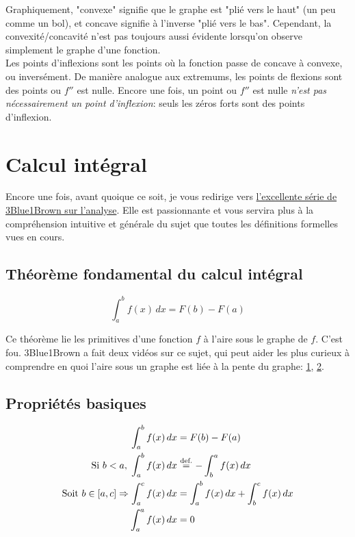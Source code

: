 \documentclass{article}
\newcommand\eqdef{\; \stackrel{ \mathclap{ \normalfont\text{def.} } }{ = } \;} %
\begin{document}
Graphiquement, "convexe" signifie que le graphe est "plié vers le haut" (un peu comme un bol), et concave signifie à l'inverse "plié vers le bas". Cependant, la convexité/concavité n'est pas toujours aussi évidente lorsqu'on observe simplement le graphe d'une fonction. \\

Les points d'inflexions sont les points où la fonction passe de concave à convexe, ou inversément. De manière analogue aux extremums, les points de flexions sont des points ou \(f''\) est nulle. Encore une fois, un point ou \(f''\) est nulle \emph{n'est pas nécessairement un point d'inflexion}: seuls les zéros forts sont des points d'inflexion.


\section{Calcul intégral}
Encore une fois, avant quoique ce soit, je vous redirige vers \href{https://www.youtube.com/playlist?list=PLZHQObOWTQDMsr9K-rj53DwVRMYO3t5Yr}{l'excellente série de 3Blue1Brown sur l'analyse}. Elle est passionnante et vous servira plus à la compréhension intuitive et générale du sujet que toutes les définitions formelles vues en cours. 

\subsection{Théorème fondamental du calcul intégral}
\begin{equation}
	\boxed{ \int_a^b f(x) \, dx = F(b) - F(a) }
\end{equation}

Ce théorème lie les primitives d'une fonction \(f\) à l'aire sous le graphe de \(f\). C'est fou. 3Blue1Brown a fait deux vidéos sur ce sujet, qui peut aider les plus curieux à comprendre en quoi l'aire sous un graphe est liée à la pente du graphe: \href{https://www.youtube.com/watch?v=rfG8ce4nNh0}{1}, \href{https://www.youtube.com/watch?v=FnJqaIESC2s}{2}.

\subsection{Propriétés basiques}
\begin{align*}
	\int_a^b f(x) \, dx &= F(b) - F(a) \\
	\text{Si } b < a, \; \int_a^b f(x) \, dx &\eqdef -\int_b^a f(x) \, dx \\
	\text{Soit } b \in \left[a, c\right] \Rightarrow \int_a^c f(x) \, dx &= \int_a^b f(x) \, dx + \int_b^c f(x) \, dx \\
	\int_a^a f(x) \, dx &= 0
\end{align*}
\end{document}

